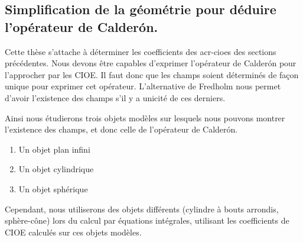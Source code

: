   \subsection{Simplification de la géométrie  pour déduire l'opérateur de Calderón.}
    Cette thèse s'attache à déterminer les coefficients des \glspl{acr-cioe} des sections précédentes.
    Nous devons être capables d'exprimer l'opérateur de Calderón pour l'approcher par les CIOE.
    Il faut donc que les champs soient déterminés de façon unique pour exprimer cet opérateur.
    L'alternative de Fredholm nous permet d'avoir l'existence des champs s'il y a unicité de ces derniers.

    Ainsi nous étudierons trois objets modèles sur lesquels nous pouvons montrer l'existence des champs, et donc celle de l'opérateur de Calderón.

    \begin{enumerate}
      \item Un objet plan infini 
      \item Un objet cylindrique
      \item Un objet sphérique
    \end{enumerate}
   
    Cependant, nous utiliserons des objets différents (cylindre à bouts arrondis, sphère-cône) lors du calcul par équations intégrales, utilisant les coefficients de CIOE calculés sur ces objets modèles.

    \begin{figure}[h!btp]
        \centering
        \begin{tikzpicture}
            
        \end{tikzpicture}
    \end{figure}

